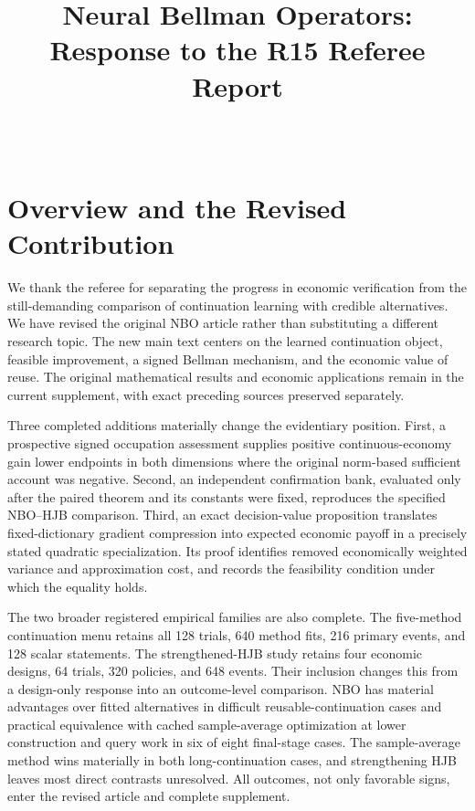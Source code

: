 \begin{frontmatter}
\title{Neural Bellman Operators: Response to the R15 Referee Report}
\begin{aug}
\author[id=au1,addressref={add1}]{~}
\address[id=add1]{Peking University}
\end{aug}
\end{frontmatter}

\section{Overview and the Revised Contribution}
We thank the referee for separating the progress in economic verification from the still-demanding comparison of continuation learning with credible alternatives. We have revised the original NBO article rather than substituting a different research topic. The new main text centers on the learned continuation object, feasible improvement, a signed Bellman mechanism, and the economic value of reuse. The original mathematical results and economic applications remain in the current supplement, with exact preceding sources preserved separately.

Three completed additions materially change the evidentiary position. First, a prospective signed occupation assessment supplies positive continuous-economy gain lower endpoints in both dimensions where the original norm-based sufficient account was negative. Second, an independent confirmation bank, evaluated only after the paired theorem and its constants were fixed, reproduces the specified NBO--HJB comparison. Third, an exact decision-value proposition translates fixed-dictionary gradient compression into expected economic payoff in a precisely stated quadratic specialization. Its proof identifies removed economically weighted variance and approximation cost, and records the feasibility condition under which the equality holds.

The two broader registered empirical families are also complete. The five-method continuation menu retains all 128 trials, 640 method fits, 216 primary events, and 128 scalar statements. The strengthened-HJB study retains four economic designs, 64 trials, 320 policies, and 648 events. Their inclusion changes this from a design-only response into an outcome-level comparison. NBO has material advantages over fitted alternatives in difficult reusable-continuation cases and practical equivalence with cached sample-average optimization at lower construction and query work in six of eight final-stage cases. The sample-average method wins materially in both long-continuation cases, and strengthening HJB leaves most direct contrasts unresolved. All outcomes, not only favorable signs, enter the revised article and complete supplement.

